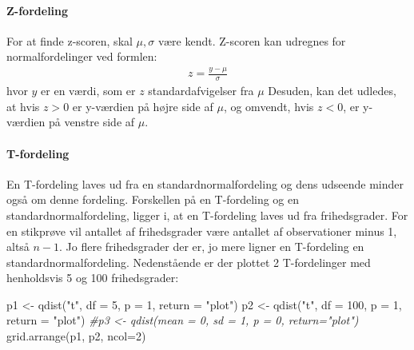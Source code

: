 \documentclass[
]{article}
\newenvironment{Shaded}{\begin{snugshade}}{\end{snugshade}}
\newcommand{\AttributeTok}[1]{\textcolor[rgb]{0.77,0.63,0.00}{#1}}
\newcommand{\CommentTok}[1]{\textcolor[rgb]{0.56,0.35,0.01}{\textit{#1}}}
\newcommand{\DecValTok}[1]{\textcolor[rgb]{0.00,0.00,0.81}{#1}}
\newcommand{\FunctionTok}[1]{\textcolor[rgb]{0.00,0.00,0.00}{#1}}
\newcommand{\NormalTok}[1]{#1}
\newcommand{\OtherTok}[1]{\textcolor[rgb]{0.56,0.35,0.01}{#1}}
\newcommand{\StringTok}[1]{\textcolor[rgb]{0.31,0.60,0.02}{#1}}
\begin{document}
\hypertarget{z-fordeling}{%
\paragraph{Z-fordeling}\label{z-fordeling}}

For at finde z-scoren, skal \(\mu,\sigma\) være kendt. Z-scoren kan
udregnes for normalfordelinger ved formlen: \[
\begin{aligned}
z = \frac{y-\mu}\sigma
\end{aligned}
\] hvor \(y\) er en værdi, som er \(z\) standardafvigelser fra \(\mu\)
Desuden, kan det udledes, at hvis \(z>0\) er y-værdien på højre side af
\(\mu\), og omvendt, hvis \(z<0\), er y-værdien på venstre side af
\(\mu\).

\hypertarget{t-fordeling}{%
\paragraph{T-fordeling}\label{t-fordeling}}

En T-fordeling laves ud fra en standardnormalfordeling og dens udseende
minder også om denne fordeling. Forskellen på en T-fordeling og en
standardnormalfordeling, ligger i, at en T-fordeling laves ud fra
frihedsgrader. For en stikprøve vil antallet af frihedsgrader være
antallet af observationer minus 1, altså \(n-1\). Jo flere frihedsgrader
der er, jo mere ligner en T-fordeling en standardnormalfordeling.
Nedenstående er der plottet 2 T-fordelinger med henholdsvis 5 og 100
frihedsgrader:

\begin{Shaded}
\begin{Highlighting}[]
\NormalTok{p1 }\OtherTok{\textless{}{-}} \FunctionTok{qdist}\NormalTok{(}\StringTok{"t"}\NormalTok{, }\AttributeTok{df =} \DecValTok{5}\NormalTok{, }\AttributeTok{p =} \DecValTok{1}\NormalTok{, }\AttributeTok{return =} \StringTok{"plot"}\NormalTok{)}
\NormalTok{p2 }\OtherTok{\textless{}{-}} \FunctionTok{qdist}\NormalTok{(}\StringTok{"t"}\NormalTok{, }\AttributeTok{df =} \DecValTok{100}\NormalTok{, }\AttributeTok{p =} \DecValTok{1}\NormalTok{, }\AttributeTok{return =} \StringTok{"plot"}\NormalTok{)}
\CommentTok{\#p3 \textless{}{-} qdist(mean = 0, sd = 1, p = 0, return="plot")}
\FunctionTok{grid.arrange}\NormalTok{(p1, p2, }\AttributeTok{ncol=}\DecValTok{2}\NormalTok{)}
\end{Highlighting}
\end{Shaded}
\end{document}
